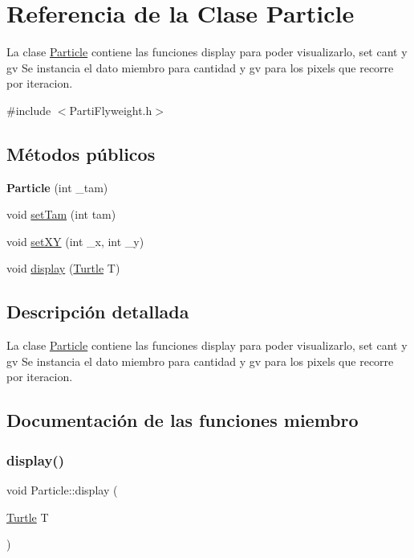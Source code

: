 \hypertarget{classParticle}{}\section{Referencia de la Clase Particle}
\label{classParticle}


La clase \hyperlink{classParticle}{Particle} contiene las funciones display para poder visualizarlo, set cant y gv  Se instancia el dato miembro para cantidad y gv para los pixels que recorre por iteracion.  




{\ttfamily \#include $<$Parti\+Flyweight.\+h$>$}

\subsection*{Métodos públicos}
\begin{DoxyCompactItemize}
\item 
\mbox{\label{classParticle_ab565c9d9aa94223ba60335215701e88f}} 
{\bfseries Particle} (int \+\_\+tam)
\item 
void \hyperlink{classParticle_abd939556d3a09985d90db3dd13809c5c}{set\+Tam} (int tam)
\item 
void \hyperlink{classParticle_a8a6aaeb2562d8540f42e5f63215bd207}{set\+XY} (int \+\_\+x, int \+\_\+y)
\item 
void \hyperlink{classParticle_ab9e7c76c8d36b1bf5082c6284ac515f7}{display} (\hyperlink{classTurtle}{Turtle} T)
\end{DoxyCompactItemize}


\subsection{Descripción detallada}
La clase \hyperlink{classParticle}{Particle} contiene las funciones display para poder visualizarlo, set cant y gv  Se instancia el dato miembro para cantidad y gv para los pixels que recorre por iteracion. 

\subsection{Documentación de las funciones miembro}
\mbox{\label{classParticle_ab9e7c76c8d36b1bf5082c6284ac515f7}} 
\subsubsection{\texorpdfstring{display()}{display()}}
{\footnotesize\ttfamily void Particle\+::display (\begin{DoxyParamCaption}\item[{\hyperlink{classTurtle}{Turtle}}]{T }\end{DoxyParamCaption})}

